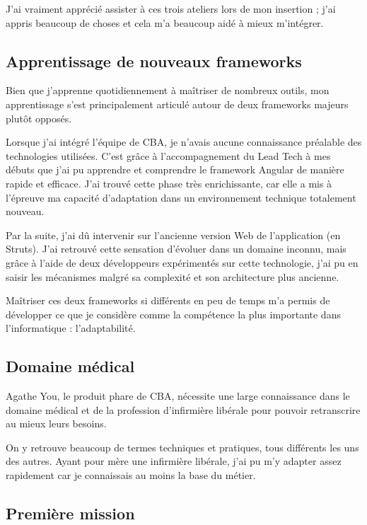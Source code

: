 \documentclass{article}
\begin{document}
J'ai vraiment apprécié assister à ces trois ateliers lors de mon insertion ; j'ai appris beaucoup de choses et cela m'a beaucoup aidé à mieux m'intégrer.

\newpage

\subsection{Apprentissage de nouveaux frameworks}

Bien que j'apprenne quotidiennement à maîtriser de nombreux outils, mon apprentissage s'est principalement articulé autour de deux frameworks majeurs plutôt opposés.

Lorsque j'ai intégré l'équipe de CBA, je n'avais aucune connaissance préalable des technologies utilisées. C'est grâce à l'accompagnement du Lead Tech à mes débuts que j'ai pu apprendre et comprendre le framework Angular de manière rapide et efficace. J'ai trouvé cette phase très enrichissante, car elle a mis à l'épreuve ma capacité d'adaptation dans un environnement technique totalement nouveau.

Par la suite, j'ai dû intervenir sur l'ancienne version Web de l'application (en Struts). J'ai retrouvé cette sensation d'évoluer dans un domaine inconnu, mais grâce à l'aide de deux développeurs expérimentés sur cette technologie, j'ai pu en saisir les mécanismes malgré sa complexité et son architecture plus ancienne.

Maîtriser ces deux frameworks si différents en peu de temps m'a permis de développer ce que je considère comme la compétence la plus importante dans l'informatique : l'adaptabilité.

\subsection{Domaine médical}

Agathe You, le produit phare de CBA, nécessite une large connaissance dans le domaine médical et de la profession d'infirmière libérale pour pouvoir retranscrire au mieux leurs besoins.

On y retrouve beaucoup de termes techniques et pratiques, tous différents les uns des autres.
Ayant pour mère une infirmière libérale, j'ai pu m'y adapter assez rapidement car je connaissais au moins la base du métier.

\subsection{Première mission}
\end{document}
